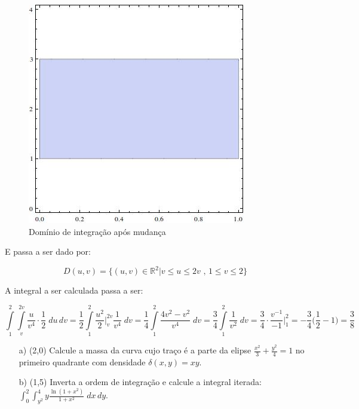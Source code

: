 \documentclass[12pt,a4paper]{article}
\newcommand{\re}{\mathbb{R}}
\begin{document}
\begin{itemize}
\begin{figure}[h!]
	\centering
	\includegraphics[scale=0.4]{Q1b2A.jpg}  
	\caption{Domínio de integração após mudança}
	\label{fig:figura3}
\end{figure}
E passa a ser dado por:

$$D(u,v)=\{(u,v)\in \re^2|v \leq u \leq 2v\,\,\mbox{,}\,\,1 \leq v \leq 2 \}$$

A integral a ser calculada passa a ser:

$$ \int\limits_1^2 \int\limits_v^{2v} \frac{u}{v^4} \cdot \frac{1}{2} \; du \, dv = \frac{1}{2} \int\limits_1^2  \frac{u^2}{2} \Big|_v^{2v} \frac{1}{v^4}  \; dv = \frac{1}{4} \int\limits_1^2  \frac{4v^2 - v^2}{v^4}  \; dv = \frac{3}{4} \int\limits_1^2  \frac{1}{v^2}  \; dv = \frac{3}{4} \cdot \frac{v^{-1}}{-1} \Big|_1^2 = -\frac{3}{4} \Big( \frac{1}{2} -1 \Big) = \frac{3}{8} $$

\end{itemize}

\newpage


\begin{itemize}
\item[a)] (2,0) Calcule a massa da curva cujo traço é a parte da elipse $\displaystyle\frac{x^2}{3} + \displaystyle\frac{y^2}{4} = 1 $ no primeiro quadrante com densidade $\delta(x,y) = xy$. \\
\item[b)] (1,5) Inverta a ordem de integração e calcule a integral iterada: $\displaystyle\int_0^2 \int_{y^2}^4 y \frac{\ln (1+x^2)}{1+x^2} \; dx \, dy$.
\end{itemize}
\end{document}
